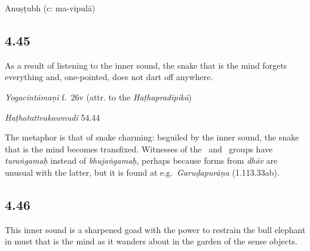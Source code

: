 \begin{ekdosis}
\begin{philcomm}[hp04_044_1]

\end{philcomm}

\begin{metre}[hp04_044_1]
Anuṣṭubh (c: ma-vipulā)
\end{metre}

\subsection*{4.45}
\begin{translation}[hp04_045]
As a result of listening to the inner sound, the snake that is the mind forgets everything and, one-pointed, does not dart off anywhere.
\end{translation}


\begin{testimonia}[hp04_045]
\emph{Yogacintāmaṇi} f.~26v (attr. to the \emph{Haṭhapradīpikā})
\begin{versinnote}
\end{versinnote}

\emph{Haṭhatattvakaumudī} 54.44
\begin{versinnote}
\end{versinnote}
\end{testimonia}

\begin{philcomm}[hp04_045]
The metaphor is that of snake charming: beguiled by the inner sound, the snake that is the mind becomes transfixed. Witnesses of the \gamma \ and \delta \ groups have \emph{turaṅgamaḥ} instead of \emph{bhujaṅgamaḥ}, perhaps because forms from \emph{dhāv} are unusual with the latter, but it is found at e.g.~\emph{Garuḍapurāṇa} (1.113.33ab). 
\end{philcomm}

\subsection*{4.46}
\begin{translation}[hp04_046]
This inner sound is a sharpened goad with the power to restrain the bull elephant in must that is the mind as it wanders about in the garden of the sense objects.
\end{translation} %


\end{ekdosis}
